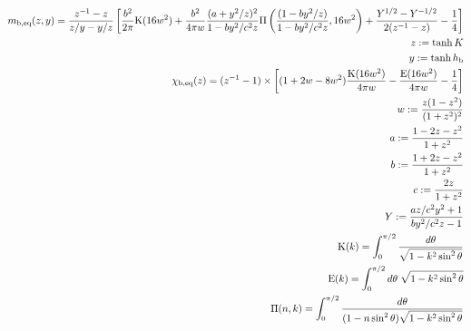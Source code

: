 \documentclass[10pt,a4paper]{jsarticle}
\begin{document}
\begin{align}
m_{\rm b,eq}(z,y)=\frac{z^{-1}-z}{z/y-y/z}\left[\frac{b^{2}}{2\pi}\mathrm{K}(16w^{2})+\frac{b^{2}}{4\pi w}\frac{(a+y^{2}/z)^{2}}{1-by^{2}/c^{2}z}\mathrm{\Pi}\left(\frac{(1-by^{2}/z)}{1-by^{2}/c^{2}z},16w^{2}\right) + \frac{Y^{1/2}-Y^{-1/2}}{2(z^{-1}-z)}-\frac{1}{4}\right]\\
z:=\tanh K\\
y:=\tanh h_{\rm b}\\
\chi_{\rm b, eq}(z)=(z^{-1}-1)\times\left[(1+2w-8w^{2})\frac{\mathrm{K}(16w^{2})}{4\pi w}-\frac{\mathrm{E}(16w^{2})}{4\pi w} - \frac{1}{4}\right]\\
w:=\frac{z(1-z^{2})}{(1+z^{2})^{2}}\\
a:=\frac{1-2z-z^{2}}{1+z^{2}}\\
b:=\frac{1+2z-z^{2}}{1+z^{2}}\\
c:=\frac{2z}{1+z^{2}}\\
Y:=\frac{az/c^{2}y^{2}+1}{by^{2}/c^{2}z-1}\\
\mathrm{K}(k)=\int_{0}^{\pi/2}\frac{d\theta}{\sqrt{1-k^{2}\sin^{2}\theta}}\\
\mathrm{E}(k)=\int_{0}^{\pi/2}d\theta\;\sqrt{1-k^{2}\sin^{2}\theta}\\
\mathrm{\Pi}(n,k)=\int_{0}^{\pi/2}\frac{d\theta}{(1-n\sin^{2}\theta)\sqrt{1-k^{2}\sin^{2}\theta}}
\end{align}
\end{document}
